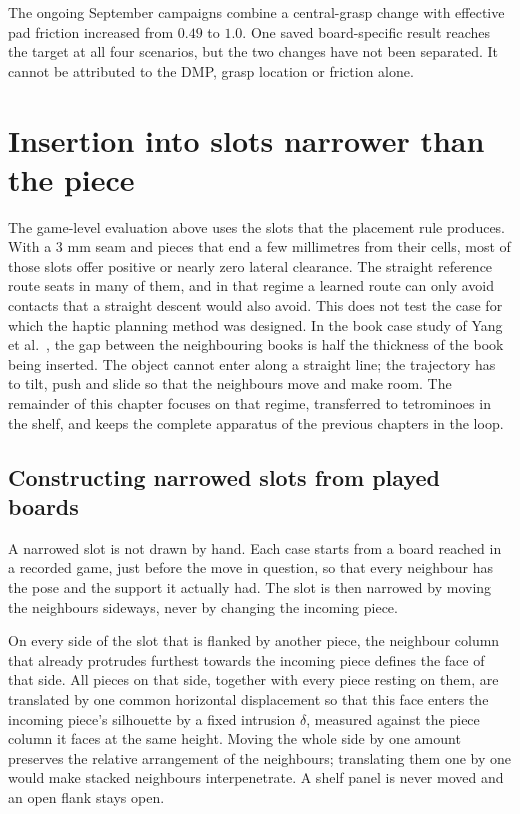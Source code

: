 The ongoing September campaigns combine a central-grasp change with effective pad friction increased from $0.49$ to $1.0$. One saved board-specific result reaches the target at all four scenarios, but the two changes have not been separated. It cannot be attributed to the DMP, grasp location or friction alone.

\section{Insertion into slots narrower than the piece}
\label{sec:tight-slots}

The game-level evaluation above uses the slots that the placement rule produces. With a $3$ mm seam and pieces that end a few millimetres from their cells, most of those slots offer positive or nearly zero lateral clearance. The straight reference route seats in many of them, and in that regime a learned route can only avoid contacts that a straight descent would also avoid. This does not test the case for which the haptic planning method was designed. In the book case study of Yang et al.~\cite{yang2025haptic}, the gap between the neighbouring books is half the thickness of the book being inserted. The object cannot enter along a straight line; the trajectory has to tilt, push and slide so that the neighbours move and make room. The remainder of this chapter focuses on that regime, transferred to tetrominoes in the shelf, and keeps the complete apparatus of the previous chapters in the loop.

\subsection{Constructing narrowed slots from played boards}

A narrowed slot is not drawn by hand. Each case starts from a board reached in a recorded game, just before the move in question, so that every neighbour has the pose and the support it actually had. The slot is then narrowed by moving the neighbours sideways, never by changing the incoming piece.

On every side of the slot that is flanked by another piece, the neighbour column that already protrudes furthest towards the incoming piece defines the face of that side. All pieces on that side, together with every piece resting on them, are translated by one common horizontal displacement so that this face enters the incoming piece's silhouette by a fixed intrusion $\delta$, measured against the piece column it faces at the same height. Moving the whole side by one amount preserves the relative arrangement of the neighbours; translating them one by one would make stacked neighbours interpenetrate. A shelf panel is never moved and an open flank stays open.

